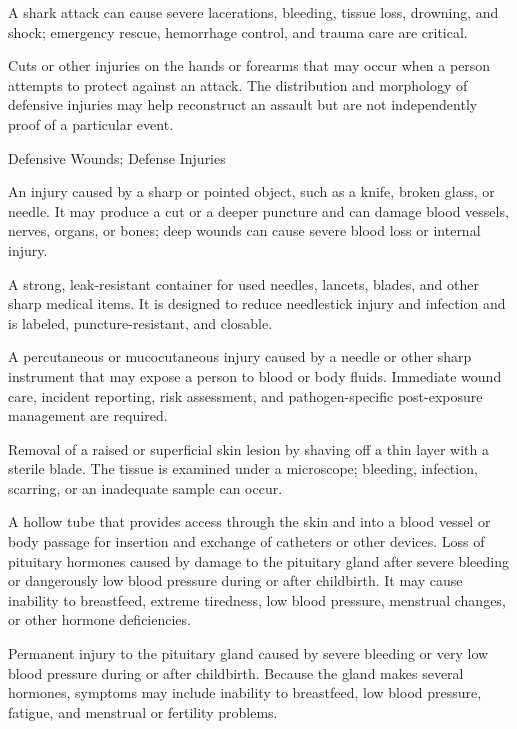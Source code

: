  A shark attack can cause severe lacerations, bleeding, tissue loss, drowning, and shock; emergency rescue, hemorrhage control, and trauma care are critical.

 Cuts or other injuries on the hands or forearms that may occur when a person attempts to protect against an attack.
The distribution and morphology of defensive injuries may help
reconstruct an assault but are not independently proof of a particular event.

\synonyms
Defensive Wounds; Defense Injuries

 An injury caused by a sharp or pointed object, such as a knife, broken glass, or needle. It may produce a cut or a deeper puncture and can damage blood vessels, nerves, organs, or bones; deep wounds can cause severe blood loss or internal injury.

 A strong, leak-resistant container for used needles, lancets, blades, and other sharp medical items. It is designed to reduce needlestick injury and infection and is labeled, puncture-resistant, and closable.

 A percutaneous or mucocutaneous injury caused by a needle or other sharp instrument that
may expose a person to blood or body fluids. Immediate wound care, incident reporting,
risk assessment, and pathogen-specific post-exposure management are required.

 Removal of a raised or superficial skin lesion by shaving off a thin layer with a sterile blade. The tissue is examined under a microscope; bleeding, infection, scarring, or an inadequate sample can occur.

 A hollow tube that provides access through the skin and into a blood vessel or body passage for insertion and exchange of catheters or other devices.
 Loss of pituitary hormones caused by damage to the pituitary gland after severe bleeding or dangerously low blood pressure during or after childbirth. It may cause inability to breastfeed, extreme tiredness, low blood pressure, menstrual changes, or other hormone deficiencies.

 Permanent injury to the pituitary gland caused by severe bleeding or very low blood pressure during or after childbirth. Because the gland makes several hormones, symptoms may include inability to breastfeed, low blood pressure, fatigue, and menstrual or fertility problems.

